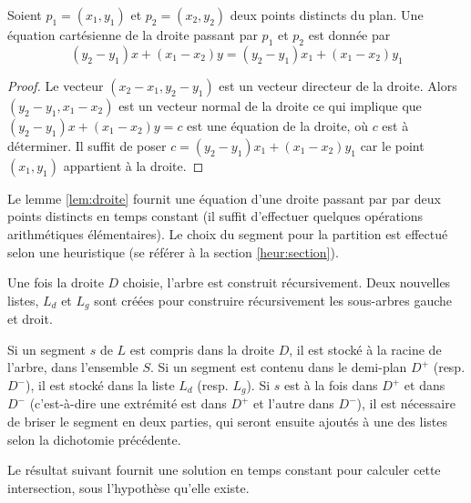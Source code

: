 \begin{lem}\label{lem:droite}
  Soient $p_1 = (x_1, y_1)$ et $p_2 = (x_2, y_2)$ deux points distincts du
  plan. Une équation cartésienne de la droite  passant par $p_1$ et $p_2$
  est donnée par
  \begin{equation}
    \left(y_2 - y_1\right) x + \left(x_1 - x_2\right) y =
    \left(y_2 - y_1\right) x_1 + \left(x_1 - x_2\right) y_1
  \end{equation}
\end{lem}
\begin{proof}
  Le vecteur $(x_2 - x_1, y_2 - y_1)$ est un vecteur directeur de la droite.
  Alors $(y_2 - y_1, x_1 - x_2)$ est un vecteur normal de la droite ce qui
  implique que
  $\left(y_2 - y_1\right) x + \left(x_1 - x_2\right) y = c$ est une équation
  de la droite, où $c$ est à déterminer. Il suffit de poser
  $c = \left(y_2 - y_1\right) x_1 + \left(x_1 - x_2\right) y_1$
  car le point $(x_1, y_1)$ appartient à la droite.
\end{proof}

Le lemme \ref{lem:droite} fournit une équation d'une droite passant par
par deux points distincts en temps constant (il suffit d'effectuer
quelques opérations arithmétiques élémentaires). Le choix du segment
pour la partition est effectué selon une heuristique (se référer à la section
\ref{heur:section}).

Une fois la droite $D$ choisie, l'arbre est construit récursivement.
Deux nouvelles listes, $L_d$ et $L_g$ sont créées pour construire récursivement
les sous-arbres gauche et droit.

Si un segment $s$ de $L$ est compris dans la droite $D$, il est stocké à
la racine de l'arbre, dans l'ensemble $S$. Si un segment est contenu dans
le demi-plan $D^+$ (resp. $D^-$), il est stocké dans la liste $L_d$ (resp.
$L_g$). Si $s$ est à la fois dans $D^+$ et dans $D^-$ (c'est-à-dire une
extrémité est dans $D^+$ et l'autre dans $D^-$), il est nécessaire
de briser le segment en deux parties, qui seront ensuite ajoutés à une des
listes selon la dichotomie précédente.

Le résultat suivant fournit une solution en temps constant pour calculer
cette intersection, sous l'hypothèse qu'elle existe.

